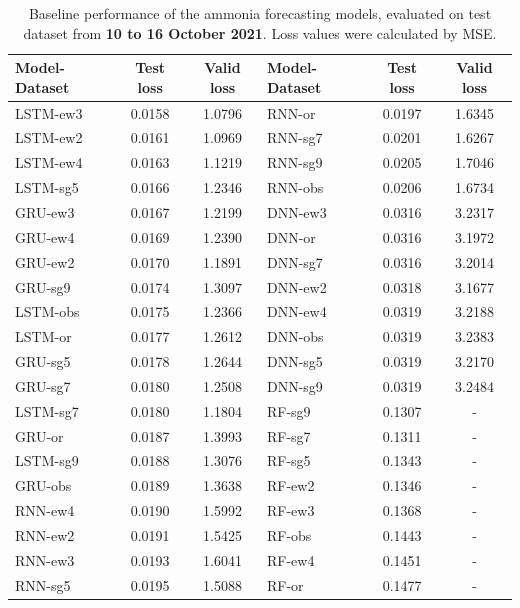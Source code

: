 \begin{table}[!ht]
    \centering
    \caption{Baseline performance of the ammonia forecasting models, evaluated on test dataset from \textbf{10 to 16 October 2021}. Loss values were calculated by MSE.}\label{tab:baseline-result-oct-nh3}
    \begin{NiceTabular}{lcclcc}
        \toprule
        Model-Dataset & Test loss & Valid loss & Model-Dataset & Test loss & Valid loss \\
        \midrule
        LSTM-ew3 & 0.0158 & 1.0796 & RNN-or  & 0.0197 & 1.6345 \\
        LSTM-ew2 & 0.0161 & 1.0969 & RNN-sg7 & 0.0201 & 1.6267 \\
        LSTM-ew4 & 0.0163 & 1.1219 & RNN-sg9 & 0.0205 & 1.7046 \\
        LSTM-sg5 & 0.0166 & 1.2346 & RNN-obs & 0.0206 & 1.6734 \\
        GRU-ew3  & 0.0167 & 1.2199 & DNN-ew3 & 0.0316 & 3.2317 \\
        GRU-ew4  & 0.0169 & 1.2390 & DNN-or  & 0.0316 & 3.1972 \\
        GRU-ew2  & 0.0170 & 1.1891 & DNN-sg7 & 0.0316 & 3.2014 \\
        GRU-sg9  & 0.0174 & 1.3097 & DNN-ew2 & 0.0318 & 3.1677 \\
        LSTM-obs & 0.0175 & 1.2366 & DNN-ew4 & 0.0319 & 3.2188 \\
        LSTM-or  & 0.0177 & 1.2612 & DNN-obs & 0.0319 & 3.2383 \\
        GRU-sg5  & 0.0178 & 1.2644 & DNN-sg5 & 0.0319 & 3.2170 \\
        GRU-sg7  & 0.0180 & 1.2508 & DNN-sg9 & 0.0319 & 3.2484 \\
        LSTM-sg7 & 0.0180 & 1.1804 & RF-sg9  & 0.1307 & - \\
        GRU-or   & 0.0187 & 1.3993 & RF-sg7  & 0.1311 & - \\
        LSTM-sg9 & 0.0188 & 1.3076 & RF-sg5  & 0.1343 & - \\
        GRU-obs  & 0.0189 & 1.3638 & RF-ew2  & 0.1346 & - \\
        RNN-ew4  & 0.0190 & 1.5992 & RF-ew3  & 0.1368 & - \\
        RNN-ew2  & 0.0191 & 1.5425 & RF-obs  & 0.1443 & - \\
        RNN-ew3  & 0.0193 & 1.6041 & RF-ew4  & 0.1451 & - \\
        RNN-sg5  & 0.0195 & 1.5088 & RF-or   & 0.1477 & - \\
        \bottomrule
    \end{NiceTabular}
\end{table}


